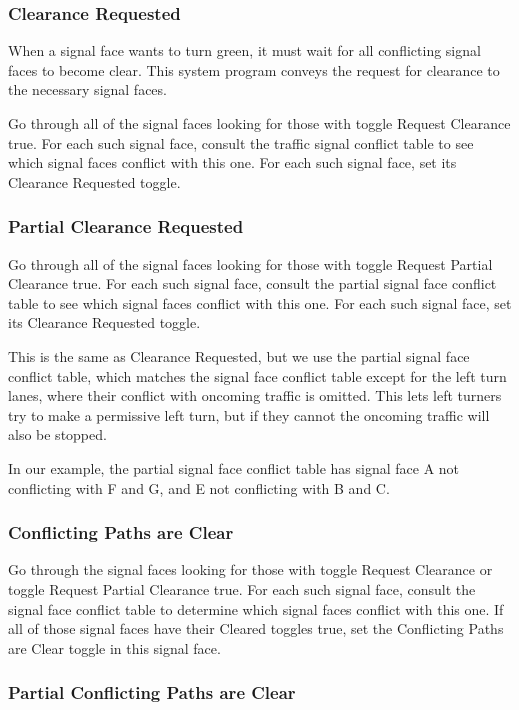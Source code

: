 \documentclass[letterpaper,twoside]{article}
\begin{document}
\subsubsection{Clearance Requested}

When a signal face wants to turn green, it must wait for all conflicting
signal faces to become clear.  This system program conveys the request
for clearance to the necessary signal faces.

Go through all of the signal faces looking for those with toggle
Request Clearance true.  For each such signal face, consult the traffic
signal conflict table to see which signal faces conflict with this one.
For each such signal face, set its Clearance Requested toggle.

\subsubsection{Partial Clearance Requested}

Go through all of the signal faces looking for those with toggle
Request Partial Clearance true.  For each such signal face, consult the
partial signal face conflict table to see which signal faces conflict
with this one.
For each such signal face, set its Clearance Requested toggle.

This is the same as Clearance Requested, but we use the partial signal face
conflict table, which matches the signal face conflict table except
for the left turn lanes, where their conflict with oncoming traffic is
omitted.
This lets left turners try to make a
permissive left turn, but if they cannot the oncoming traffic will also
be stopped.

In our example, the partial signal face conflict table
has signal face A not conflicting with F and G, and E not
conflicting with B and C.  

\subsubsection{Conflicting Paths are Clear}

Go through the signal faces looking for those with toggle Request Clearance
or toggle Request Partial Clearance
true.  For each such signal face, consult the signal face conflict table
to determine which signal faces conflict with this one.  If all of those
signal faces have their Cleared toggles true, set the Conflicting Paths
are Clear toggle in this signal face.

\subsubsection{Partial Conflicting Paths are Clear}
\end{document}
